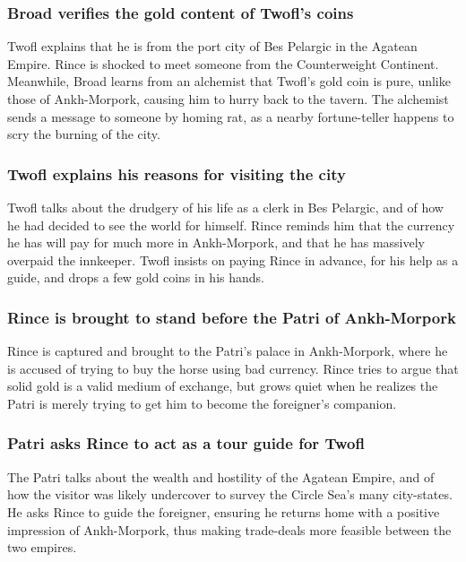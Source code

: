 \subsubsection{\Gls{Broad} verifies the gold content of \Gls{Twofl}'s coins}
\Gls{Twofl} explains that he is from the port city of Bes Pelargic in the Agatean Empire.
\Gls{Rince} is shocked to meet someone from the Counterweight Continent. Meanwhile, \Gls{Broad}
learns from an alchemist that \Gls{Twofl}'s gold coin is pure, unlike those of Ankh-Morpork, causing
him to hurry back to the tavern. The alchemist sends a message to someone by homing rat, as a
nearby fortune-teller happens to scry the burning of the city.

\subsubsection{\Gls{Twofl} explains his reasons for visiting the city}
\Gls{Twofl} talks about the drudgery of his life as a clerk in Bes Pelargic, and of how he had
decided to see the world for himself. \Gls{Rince} reminds him that the currency he has will pay for
much more in Ankh-Morpork, and that he has massively overpaid the innkeeper. \Gls{Twofl} insists on
paying \Gls{Rince} in advance, for his help as a guide, and drops a few gold coins in his hands.

\subsubsection{\Gls{Rince} is brought to stand before the \Gls{Patri} of Ankh-Morpork}
\Gls{Rince} is captured and brought to the \Gls{Patri}'s palace in Ankh-Morpork, where he is accused
of trying to buy the horse using bad currency. \Gls{Rince} tries to argue that solid gold is a valid
medium of exchange, but grows quiet when he realizes the \Gls{Patri} is merely trying to get him to
become the foreigner's companion.

\subsubsection{\Gls{Patri} asks \Gls{Rince} to act as a tour guide for \Gls{Twofl}}
The \Gls{Patri} talks about the wealth and hostility of the Agatean Empire, and of how the visitor
was likely undercover to survey the Circle Sea's many city-states. He asks \Gls{Rince} to guide
the foreigner, ensuring he returns home with a positive impression of Ankh-Morpork, thus making
trade-deals more feasible between the two empires.

